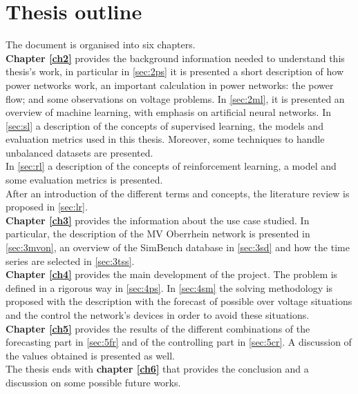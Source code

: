 \section{Thesis outline}

The document is organised into six chapters.\\ 


\noindent \textbf{Chapter \ref{ch2}} provides the background information needed to understand this thesis's work, in particular in \ref{sec:2ps} it is presented a short description of how power networks work, an important calculation in power networks: the power flow; and some observations on voltage problems. In \ref{sec:2ml}, it is presented an overview of machine learning, with emphasis on artificial neural networks. In \ref{sec:sl} a description of the concepts of supervised learning, the models and evaluation metrics used in this thesis. Moreover, some techniques to handle unbalanced datasets are presented. \\
In \ref{sec:rl} a description of the concepts of reinforcement learning, a model and some evaluation metrics is presented.\\
After an introduction of the different terms and concepts, the literature review is proposed in \ref{sec:lr}.\\

\noindent \textbf{Chapter \ref{ch3}} provides the information about the use case studied. In particular, the description of the MV Oberrhein network is presented in \ref{sec:3mvon}, an overview of the SimBench database in \ref{sec:3sd} and how the time series are selected in \ref{sec:3tss}.\\

\noindent \textbf{Chapter \ref{ch4}} provides the main development of the project. The problem is defined in a rigorous way in \ref{sec:4ps}. In \ref{sec:4sm} the solving methodology is proposed with the description with the forecast of possible over voltage situations and the control the network's devices in order to avoid these situations.\\

\noindent \textbf{Chapter \ref{ch5}} provides the results of the different combinations of the forecasting part in \ref{sec:5fr} and of the controlling part in \ref{sec:5cr}. A discussion of the values obtained is presented as well.\\

\noindent The thesis ends with \textbf{chapter \ref{ch6}} that provides the conclusion and a discussion on some possible future works.


